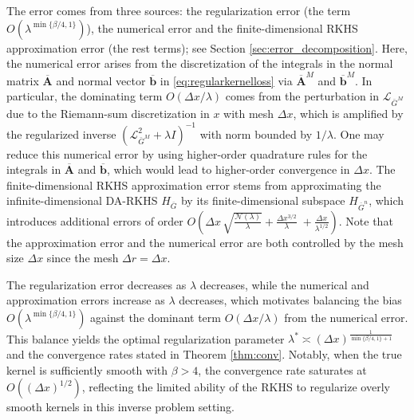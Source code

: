 \documentclass[12pt]{article}
\def\Gbar{ {\overline{G}} }
\def\Abar{ {\overline{A}} }
\def\bbar{ {\overline{b}} }
\numberwithin{equation}{section}
\numberwithin{theorem}{section}
\begin{document}
The error comes from three sources: the regularization error (the term $O(\lambda^{\min \{\beta / 4,1\}})$), the numerical error and the finite-dimensional RKHS approximation error (the rest terms); see Section \ref{sec:error_decomposition}.  Here, the numerical error arises from the discretization of the integrals in the normal matrix $\mathbf{\Abar}$ and normal vector $\mathbf{\bbar}$ in \eqref{eq:regularkernelloss} via $\mathbf{\Abar}^M$ and $\mathbf{\bbar} ^M$. In particular, the dominating term $O(\Delta x/\lambda)$ comes from the perturbation in $\mathcal{L}_{\bar{G}^M}$ due to the Riemann-sum discretization in $x$ with mesh $\Delta x$, which is amplified by the regularized inverse $(\mathcal{L}_{\bar{G}^M}^2+\lambda I)^{-1}$ with norm bounded by $1/\lambda$. One may reduce this numerical error by using higher-order quadrature rules for the integrals in $\mathbf{\Abar}$ and $\mathbf{\bbar}$, which would lead to higher-order convergence in $\Delta x$.
The finite-dimensional RKHS approximation error stems from approximating the infinite-dimensional DA-RKHS $H_{\Gbar}$ by its finite-dimensional subspace $H_{\Gbar^n}$, which introduces additional errors of order  
$O(\Delta x\,\sqrt{\frac{\mathcal{N}(\lambda)}{\lambda}} + 
 \frac{\Delta x^{3/2}}{\lambda}\;+ \frac{\Delta x}{\lambda^{1/2}})$. Note that the approximation error and the numerical error are both controlled by the mesh size $\Delta x$ since the mesh $\Delta r =\Delta x$.

 The regularization error decreases as $\lambda$ decreases, while the numerical and approximation errors increase as $\lambda$ decreases, which motivates balancing the bias $O\left(\lambda^{\min \{\beta / 4,1\}}\right)$ against the dominant term $O\left(\Delta x /\lambda\right)$ from the numerical error. This balance yields the optimal regularization parameter $\lambda^* \asymp (\Delta x)^{\frac{1}{\min \{\beta / 4,1\}+1}}$ and the convergence rates stated in Theorem \ref{thm:conv}.  Notably, when the true kernel is sufficiently smooth with $\beta>4$, the convergence rate saturates at $O\left((\Delta x)^{1/2}\right)$, reflecting the limited ability of the RKHS to regularize overly smooth kernels in this inverse problem setting. 
\end{document}
